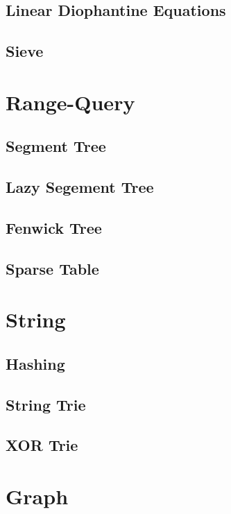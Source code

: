 \documentclass[a4paper, twocolumn]{article}
\begin{document}
\subsection{Linear Diophantine Equations}

\subsection{Sieve}



\section{Range-Query}
\subsection{Segment Tree}

\subsection{Lazy Segement Tree}

\subsection{Fenwick Tree}

\subsection{Sparse Table}



\section{String}
\subsection{Hashing}

\subsection{String Trie}

\subsection{XOR Trie}



\section{Graph}
\end{document}
